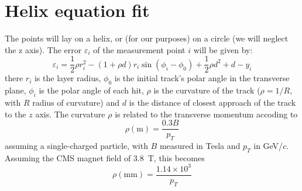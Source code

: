 \documentclass[10pt,a4paper]{article}
\begin{document}
\section{Helix equation fit}
The points will lay on a helix, or (for our purposes) on a circle (we
will neglect the z axis).  The error $\varepsilon_i$ of the
measurement point $i$ will be given by:
\begin{equation}
  \label{eq:helix}
  \varepsilon_i = \frac 1 2 \rho r_i^2 - (1 + \rho d) r_i \sin(\phi_i-\phi_0) + \frac 1 2 \rho d^2 + d -y_i
\end{equation}
there $r_i$ is the layer radius, $\phi_0$ is the initial track's polar
angle in the transverse plane, $\phi_i$ is the polar angle of each
hit, $\rho$ is the curvature of the track ($\rho=1/R$, with $R$ radius
of curvature) and $d$ is the distance of closest approach of the track
to the $z$ axis.  The curvature $\rho$ is related to the transverse
momentum accoding to
\begin{equation}
  \rho (\mathrm{m}) = \frac {0.3 B} {p_T} 
\end{equation}
assuming a single-charged particle, with $B$ measured in Tesla and
$p_T$ in GeV/$c$. Assuming the CMS magnet field of 3.8~T, this becomes
\begin{equation}
  \rho (\mathrm{mm}) = \frac {1.14\times 10^3} {p_T} 
\end{equation}
\end{document}
